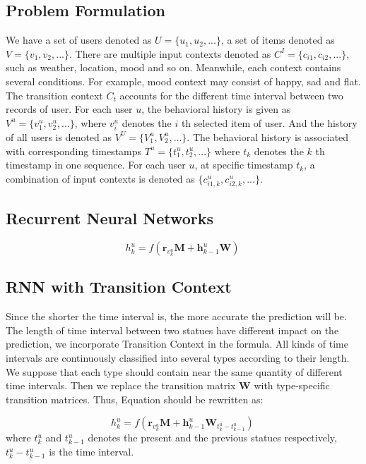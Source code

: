 \documentclass{sig-alternate}
\begin{document}
\subsection{Problem Formulation}
We have a set of users denoted as $U  = \{ u_1 ,u_2 ,...\}$, a set of items denoted as $V  = \{ v_1 ,v_2 ,...\}$. There are multiple input contexts denoted as $C^I = \{c_{i1} ,c_{i2} ,...\}$, such as weather, location, mood and so on. Meanwhile, each context contains several conditions. For example, mood context may consist of happy, sad and flat. The transition context $C_t$ accounts for the different time interval between two records of user. For each user $u$, the behavioral history is given as $V^u = \{v^u_{1}, v^u_{2}, ...\}$, where $v^u_{i}$ denotes the $i$ th selected item of user. And the history of all users is denoted as $V^U = \{V^u_{1}, V^u_{2}, ...\}$. The behavioral history is associated with corresponding timestamps $T^u = \{t^u_{1}, t^u_{2}, ...\}$ where $t_k$ denotes the $k$ th timestamp in one sequence. For each user $u$, at specific timestamp $t_k$, a combination of input contexts is denoted as $\{
c_{i1,k}^{u},c_{i2,k}^{u},...\}$.
\subsection{ Recurrent Neural Networks}
\begin{equation}
h_{k}^{u}=f\left ( \textbf{r}_{v_{k}^{u}}\textbf{M}+\textbf{h}_{k-1}^{u}\textbf{W} \right )~
\end{equation}

\subsection{ RNN with Transition Context}
Since the shorter the time interval is, the more accurate the prediction will be. The length of time interval between two statues have different impact on the prediction, we incorporate Transition Context in the formula. All kinds of time intervals are continuously classified into several types according to their length. We suppose that each type should contain near the same quantity of different time intervals. Then we replace the transition matrix $\textbf{W}$ with type-specific transition matrices. Thus, Equation should be rewritten as: 

\begin{equation}
h_{k}^{u}=f\left ( \textbf{r}_{v_{k}^{u}}\textbf{M}+\textbf{h}_{k-1}^{u}\textbf{W}_{t_k^u-t_{k-1}^u} \right )
~\end{equation}
where $t_k^u$ and $t_{k-1}^u$ denotes the present and the previous statues respectively, $t_k^u-t_{k-1}^u$ is the time interval.  
\end{document}
